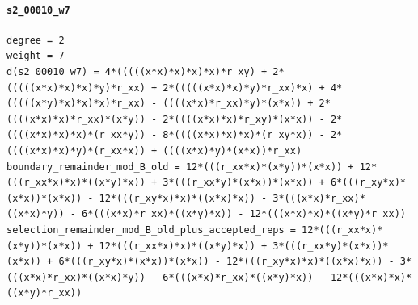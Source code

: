 \documentclass[11pt]{article}
\begin{document}
\paragraph{\texttt{s2\_00010\_w7}}
\begin{verbatim}
degree = 2
weight = 7
d(s2_00010_w7) = 4*(((((x*x)*x)*x)*x)*r_xy) + 2*(((((x*x)*x)*x)*y)*r_xx) + 2*(((((x*x)*x)*y)*r_xx)*x) + 4*(((((x*y)*x)*x)*x)*r_xx) - ((((x*x)*r_xx)*y)*(x*x)) + 2*((((x*x)*x)*r_xx)*(x*y)) - 2*((((x*x)*x)*r_xy)*(x*x)) - 2*((((x*x)*x)*x)*(r_xx*y)) - 8*((((x*x)*x)*x)*(r_xy*x)) - 2*((((x*x)*x)*y)*(r_xx*x)) + ((((x*x)*y)*(x*x))*r_xx)
boundary_remainder_mod_B_old = 12*(((r_xx*x)*(x*y))*(x*x)) + 12*(((r_xx*x)*x)*((x*y)*x)) + 3*(((r_xx*y)*(x*x))*(x*x)) + 6*(((r_xy*x)*(x*x))*(x*x)) - 12*(((r_xy*x)*x)*((x*x)*x)) - 3*(((x*x)*r_xx)*((x*x)*y)) - 6*(((x*x)*r_xx)*((x*y)*x)) - 12*(((x*x)*x)*((x*y)*r_xx))
selection_remainder_mod_B_old_plus_accepted_reps = 12*(((r_xx*x)*(x*y))*(x*x)) + 12*(((r_xx*x)*x)*((x*y)*x)) + 3*(((r_xx*y)*(x*x))*(x*x)) + 6*(((r_xy*x)*(x*x))*(x*x)) - 12*(((r_xy*x)*x)*((x*x)*x)) - 3*(((x*x)*r_xx)*((x*x)*y)) - 6*(((x*x)*r_xx)*((x*y)*x)) - 12*(((x*x)*x)*((x*y)*r_xx))
\end{verbatim}
\end{document}
